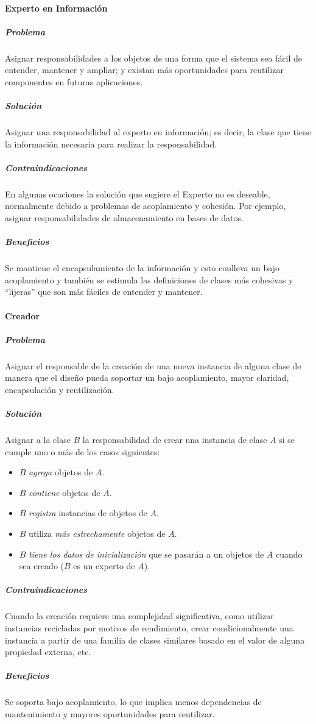 \paragraph{Experto en Información}
\subparagraph{Problema}
Asignar responsabilidades a los objetos de una forma que el sistema sea fácil de entender, mantener y ampliar; y existan más oportunidades para reutilizar componentes en futuras aplicaciones.
\subparagraph{Solución}
Asignar una responsabilidad al experto en información; es decir, la clase que tiene la información necesaria para realizar la responsabilidad.
\subparagraph{Contraindicaciones}
En algunas ocaciones la solución que sugiere el Experto no es deseable, normalmente debido a problemas de acoplamiento y cohesión. Por ejemplo, asignar responsabilidades de almacenamiento en bases de datos.
\subparagraph{Beneficios}
Se mantiene el encapsulamiento de la información y esto conlleva un bajo acoplamiento y también se estimula las definiciones de clases más cohesivas y ``lijeras'' que son más fáciles de entender y mantener.
\paragraph{Creador}
\subparagraph{Problema}
Asignar el responsable de la creación de una nueva instancia de alguna clase de manera que el diseño pueda soportar un bajo acoplamiento, mayor claridad, encapsulación y reutilización.
\subparagraph{Solución}
Asignar a la clase $B$ la responsabilidad de crear una instancia de clase $A$ si se cumple uno o más de los casos siguientes:
\begin{itemize}
\item $B$ \emph{agrega} objetos de $A$.
\item $B$ \emph{contiene} objetos de $A$.
\item $B$ \emph{registra} instancias de objetos de $A$.
\item $B$ utiliza \emph{más estrechamente} objetos de $A$.
\item $B$ \emph{tiene los datos de inicialización} que se pasarán a un objetos de $A$ cuando sea creado ($B$ es un experto de $A$).
\end{itemize}
\subparagraph{Contraindicaciones}
Cuando la creación requiere una complejidad significativa, como utilizar instancias recicladas por motivos de rendimiento, crear condicionalmente una instancia a partir de una familia de clases similares basado en el valor de alguna propiedad externa, etc.
\subparagraph{Beneficios}
Se soporta bajo acoplamiento, lo que implica menos dependencias de mantenimiento y mayores oportunidades para reutilizar.
